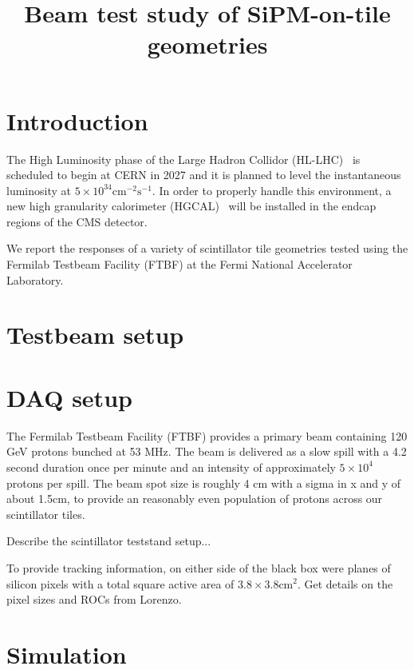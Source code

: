 \documentclass[a4paper,11pt]{article}
\title{Beam test study of SiPM-on-tile geometries}
\begin{document}
\maketitle
\flushbottom

\section{Introduction}
\label{sec:intro}

The High Luminosity phase of the Large Hadron Collidor (HL-LHC)~\cite{a} is scheduled to begin at CERN in 2027 and it is planned to level the instantaneous luminosity at $5\times 10^{34}\text{cm}^{-2}\text{s}^{-1}$. In order to properly handle this environment, a new high granularity calorimeter (HGCAL)~\cite{b} will be installed in the endcap regions of the CMS detector.

We report the responses of a variety of scintillator tile geometries tested using the Fermilab Testbeam Facility (FTBF) at the Fermi National Accelerator Laboratory.

\section{Testbeam setup}
\label{sec:setup}
\section{DAQ setup}

The Fermilab Testbeam Facility (FTBF) provides a primary beam containing 120 GeV protons bunched at 53 MHz. The beam is delivered as a slow spill with a 4.2 second duration once per minute and an intensity of approximately $5\times10^{4}$ protons per spill. The beam spot size is roughly 4 cm with a sigma in x and y of about 1.5cm, to provide an reasonably even population of protons across our scintillator tiles. 

Describe the scintillator teststand setup...

To provide tracking information, on either side of the black box were planes of silicon pixels with a total square active area of $3.8\times3.8 \mathrm{cm}^{2}$. Get details on the pixel sizes and ROCs from Lorenzo.





\section{Simulation}
\label{sec:simu}
\end{document}
